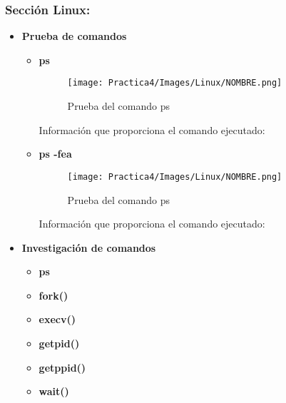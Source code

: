\documentclass[12pt]{article}
\begin{document}
            \subsubsection{Sección Linux:}
                \begin{itemize}
        	        \item[\Checkmark] \textbf{Prueba de comandos}
        	            \begin{itemize}
        	                \item \textbf{ps}
        	                    \begin{figure}[h!]
                                    \centering
                                    \texttt{[image: Practica4/Images/Linux/NOMBRE.png]}
                                        \caption{Prueba del comando ps}
                                \end{figure}
                                Información que proporciona el comando ejecutado:
                        
        	                \item \textbf{ps -fea}
        	                    \begin{figure}[h!]
                                    \centering
                                    \texttt{[image: Practica4/Images/Linux/NOMBRE.png]}
                                        \caption{Prueba del comando ps}
                                \end{figure}
                                Información que proporciona el comando ejecutado:
        	            \end{itemize}
        	       \item[\Checkmark] \textbf{Investigación de comandos}
                    \begin{itemize}
                        \item \textbf{ps}

                        \item \textbf{fork()}

                        \item \textbf{execv()}

                        \item \textbf{getpid()}

                        \item \textbf{getppid()}

                        \item \textbf{wait()}

                    \end{itemize}
            	\end{itemize}
        
\end{document}
